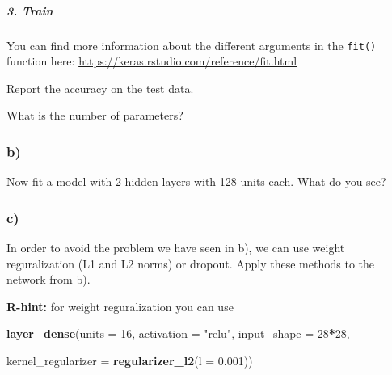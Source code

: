 \documentclass[]{article}
\newenvironment{Shaded}{\begin{snugshade}}{\end{snugshade}}
\newcommand{\DataTypeTok}[1]{\textcolor[rgb]{0.13,0.29,0.53}{#1}}
\newcommand{\DecValTok}[1]{\textcolor[rgb]{0.00,0.00,0.81}{#1}}
\newcommand{\FloatTok}[1]{\textcolor[rgb]{0.00,0.00,0.81}{#1}}
\newcommand{\KeywordTok}[1]{\textcolor[rgb]{0.13,0.29,0.53}{\textbf{#1}}}
\newcommand{\NormalTok}[1]{#1}
\newcommand{\OperatorTok}[1]{\textcolor[rgb]{0.81,0.36,0.00}{\textbf{#1}}}
\newcommand{\StringTok}[1]{\textcolor[rgb]{0.31,0.60,0.02}{#1}}
\let\oldsubparagraph\subparagraph
\renewcommand{\subparagraph}[1]{\oldsubparagraph{#1}\mbox{}}
\begin{document}
\hypertarget{train}{%
\subparagraph{3. Train}\label{train}}

\begin{Shaded}
\end{Shaded}

You can find more information about the different arguments in the
\texttt{fit()} function here:
\url{https://keras.rstudio.com/reference/fit.html}

Report the accuracy on the test data.

\begin{Shaded}
\end{Shaded}

What is the number of parameters?

\hypertarget{b-3}{%
\subsubsection{b)}\label{b-3}}

Now fit a model with 2 hidden layers with 128 units each. What do you
see?

\hypertarget{c-2}{%
\subsubsection{c)}\label{c-2}}

In order to avoid the problem we have seen in b), we can use weight
reguralization (L1 and L2 norms) or dropout. Apply these methods to the
network from b).

\textbf{R-hint:} for weight reguralization you can use

\begin{Shaded}
\begin{Highlighting}[]
\KeywordTok{layer_dense}\NormalTok{(}\DataTypeTok{units =} \DecValTok{16}\NormalTok{, }\DataTypeTok{activation =} \StringTok{"relu"}\NormalTok{, }\DataTypeTok{input_shape =} \DecValTok{28}\OperatorTok{*}\DecValTok{28}\NormalTok{, }
            
            \DataTypeTok{kernel_regularizer =} \KeywordTok{regularizer_l2}\NormalTok{(}\DataTypeTok{l =} \FloatTok{0.001}\NormalTok{))}
\end{Highlighting}
\end{Shaded}
\end{document}
